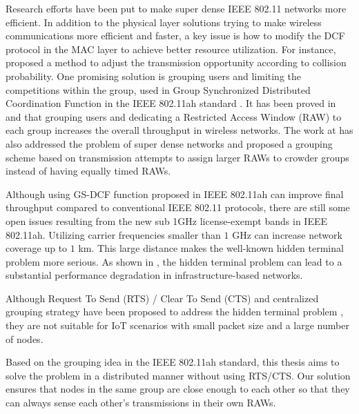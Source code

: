 Research efforts have been put to make super dense IEEE 802.11 networks more efficient. In addition to the physical layer solutions trying to make wireless communications more efficient and faster, a key issue is how to modify the DCF protocol in the MAC layer to achieve better resource utilization. For instance, \cite{zhong2014dcf} proposed a method to adjust the transmission opportunity according to collision probability. One promising solution is grouping users and limiting the competitions within the group, used in Group Synchronized Distributed Coordination Function in the IEEE 802.11ah standard \cite{Draft80211ah}. It has been proved in \cite{zheng2014performance} and \cite{raeesi2014performance} that grouping users and dedicating a Restricted Access Window (RAW) to each group increases the overall throughput in wireless networks. \iffalse CHECK THIS \fi The work at \cite{kim2015optimal} has also addressed the problem of super dense networks and proposed a grouping scheme based on transmission attempts to assign larger RAWs to crowder groups instead of having equally timed RAWs. 

Although using GS-DCF function proposed in IEEE 802.11ah can improve final throughput compared to conventional IEEE 802.11 protocols, there are still some open issues resulting from the new sub 1GHz license-exempt bands in IEEE 802.11ah. Utilizing carrier frequencies smaller than $1$ GHz can increase network coverage up to $1$ km. This large distance makes the well-known hidden terminal problem more serious. As shown in \iffalse CHECK THIS \fi \cite{wu2006wsn02,tsertou2008revisiting,khurana1999performance}, the hidden terminal problem can lead to a substantial performance degradation in infrastructure-based networks. 

Although Request To Send (RTS) / Clear To Send (CTS) and centralized grouping strategy have been proposed to address the hidden terminal problem \cite{yoonregrouping,tseng2014effective}, they are not suitable for IoT scenarios with small packet size and a large number of nodes.


Based on the grouping idea in the IEEE 802.11ah standard, this thesis aims to solve the problem in a distributed manner without using RTS/CTS. Our solution ensures that nodes in the same group are close enough to each other so that they can always sense each other's transmissions in their own RAWs.


